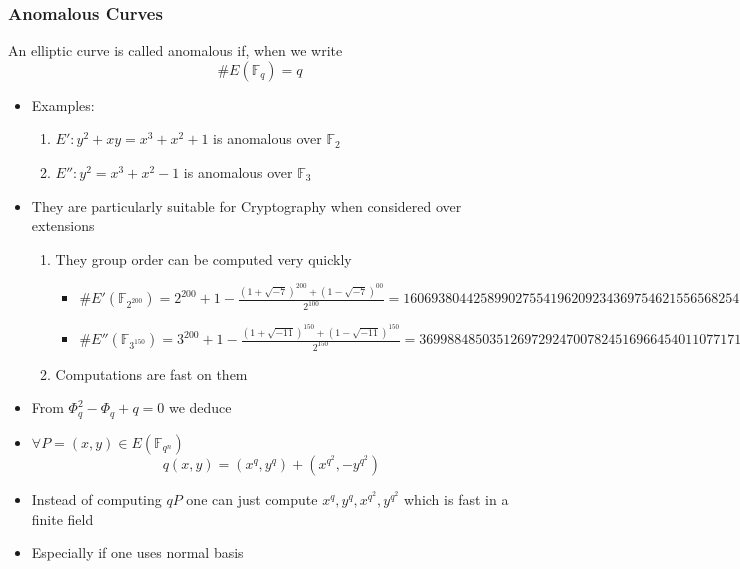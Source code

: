 \documentclass[10pt,handout]{beamer} %
\newcommand{\F}{\mathbb F}
\theoremstyle{definition}
\begin{document}
\begin{frame}
 \frametitle{Anomalous Curves}
 
 \begin{Definition}
  An elliptic curve is called \alert{anomalous} if, when we write
  $$\#E(\F_q)=q$$
 \end{Definition}\pause

 \begin{itemize}[<+-|alert@+>]
  \item Examples:
   \begin{enumerate}
    \item  $E': y^2+xy=x^3+x^2+1$ is anomalous over $\F_2$
    \item $E'': y^2=x^3 + x^2 - 1$ is anomalous over $\F_3$
   \end{enumerate}
 \item They are particularly suitable for Cryptography when considered over extensions
  \begin{enumerate}
   \item They group order can be computed very quickly
   \begin{itemize}
   \item $\#E'(\F_{2^{200}})=2^{200}+1-\frac{(1+\sqrt{-7})^{200}+(1-\sqrt{-7})^{00}}{2^{100}}=
   1606938044258990275541962092343697546215565682541130425732128$
   \item $\#E''(\F_{3^{150}})=3^{200}+1-\frac{(1+\sqrt{-11})^{150}+(1-\sqrt{-11})^{150}}{2^{150}}=
   369988485035126972924700782451696645401107717195926015868067750551938000$
   \end{itemize}
   \item Computations are fast on them
  \end{enumerate}
 \item From $\Phi_q^2-\Phi_q+q=0$ we deduce
 \item $\forall P=(x,y)\in E(\F_{q^n})$
 $$q(x,y)=(x^q,y^q)+(x^{q^2},-y^{q^2})$$
 \item Instead of computing $qP$ one can just compute $x^q,y^q, x^{q^2}, y^{q^2}$ which is fast in a finite field
 \item Especially if one uses \alert{normal basis}
 \end{itemize}
 \end{frame}
\end{document}

